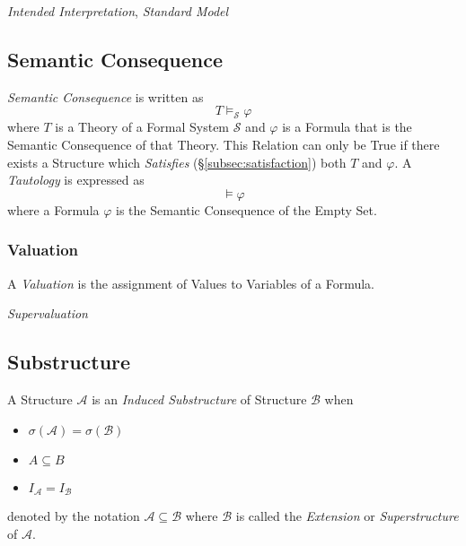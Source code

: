 \emph{Intended Interpretation}, \emph{Standard Model}



\subsection{Semantic Consequence}\label{subsec:semantic_consequence}

\emph{Semantic Consequence} is written as
\[
    T \vDash_{\mathcal{S}} \varphi
\]
where $T$ is a Theory of a Formal System $\mathcal{S}$ and $\varphi$
is a Formula that is the Semantic Consequence of that Theory. This
Relation can only be True if there exists a Structure which
\emph{Satisfies} (\S\ref{subsec:satisfaction}) both $T$ and
$\varphi$. A \emph{Tautology} is expressed as
\[
    \vDash {\varphi}
\]
where a Formula $\varphi$ is the Semantic Consequence of the Empty
Set.



\subsubsection{Valuation}\label{subsec:model_valuation}

A \emph{Valuation} is the assignment of Values to Variables of a
Formula.

\emph{Supervaluation}



\subsection{Substructure}\label{subsec:model_substructure}

A Structure $\mathcal{A}$ is an \emph{Induced Substructure} of
Structure $\mathcal{B}$ when
\begin{itemize}
\item $\sigma(\mathcal{A}) = \sigma(\mathcal{B})$
\item $A \subseteq B$
\item $I_{\mathcal{A}}=I_{\mathcal{B}}$
\end{itemize}
denoted by the notation $\mathcal{A} \subseteq \mathcal{B}$ where
$\mathcal{B}$ is called the \emph{Extension} or \emph{Superstructure}
of $\mathcal{A}$.

